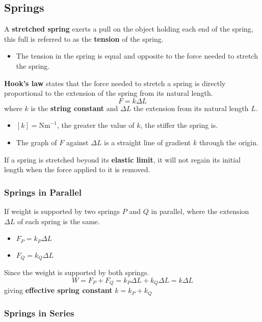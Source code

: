 \subsection{Springs}

A \textbf{stretched spring} exerts a pull on the object holding each end of the spring, this full is referred to as the \textbf{tension} of the spring.
\begin{itemize}
    \item The tension in the spring is equal and opposite to the force needed to stretch the spring.
\end{itemize}

\textbf{Hook's law} states that the force needed to stretch a spring is directly proportional to the extension of the spring from its natural length.
$$F=k\Delta L$$
where $k$ is the \textbf{string constant} and $\Delta L$ the extension from its natural length $L$.
\begin{itemize}
    \item $[k]=\text{Nm}^{-1}$, the greater the value of $k$, the stiffer the spring is.
    \item The graph of $F$ against $\Delta L$ is a straight line of gradient $k$ through the origin.
\end{itemize}

If a spring is stretched beyond its \textbf{elastic limit}, it will not regain its initial length when the force applied to it is removed.

\subsubsection*{Springs in Parallel}

If weight is supported by two springs $P$ and $Q$ in parallel, where the extension $\Delta L$ of each spring is the same.
\begin{itemize}
    \item $F_P=k_P\Delta L$
    \item $F_Q=k_Q\Delta L$
\end{itemize}

Since the weight is supported by both springs.
$$W=F_P+F_Q=k_P\Delta L+k_Q\Delta L=k\Delta L$$
giving \textbf{effective spring constant} $k=k_P+k_Q$

\subsubsection*{Springs in Series}

